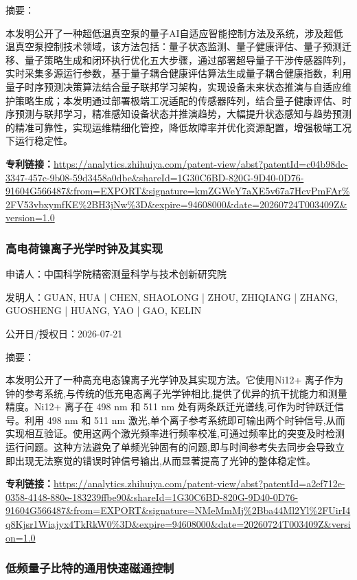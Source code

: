 \documentclass[12pt,a4paper]{ctexart}
\begin{document}
摘要：

本发明公开了一种超低温真空泵的量子AI自适应智能控制方法及系统，涉及超低温真空泵控制技术领域，该方法包括：量子状态监测、量子健康评估、量子预测迁移、量子策略生成和闭环执行优化五大步骤，通过部署超导量子干涉传感器阵列，实时采集多源运行参数，基于量子耦合健康评估算法生成量子耦合健康指数，利用量子时序预测决策算法结合量子联邦学习架构，实现设备未来状态推演与自适应维护策略生成；本发明通过部署极端工况适配的传感器阵列，结合量子健康评估、时序预测与联邦学习，精准感知设备状态并推演趋势，大幅提升状态感知与趋势预测的精准可靠性，实现运维精细化管控，降低故障率并优化资源配置，增强极端工况下运行稳定性。

\noindent\textbf{专利链接：}\url{https://analytics.zhihuiya.com/patent-view/abst?patentId=c04b98dc-3347-457c-9b08-59d3458a0dbe&shareId=1G30C6BD-820G-9D40-0D76-91604G566487&from=EXPORT&signature=kmZGWeY7aXE5v67a7HcvPmFAr%2FV53vbxymfKE%2BH3jNw%3D&expire=94608000&date=20260724T003409Z&version=1.0}

\subsubsection{ 高电荷镍离子光学时钟及其实现 }

申请人：中国科学院精密测量科学与技术创新研究院

发明人：GUAN, HUA | CHEN, SHAOLONG | ZHOU, ZHIQIANG | ZHANG, GUOSHENG | HUANG, YAO | GAO, KELIN

公开日/授权日：2026-07-21

摘要：

本发明公开了一种高充电态镍离子光学钟及其实现方法。它使用Ni12+ 离子作为钟的参考系统,与传统的低充电态离子光学钟相比,提供了优异的抗干扰能力和测量精度。Ni12+ 离子在 498 nm 和 511 nm 处有两条跃迁光谱线,可作为时钟跃迁信号。利用 498 nm 和 511 nm 激光,单个离子参考系统即可输出两个时钟信号,从而实现相互验证。使用这两个激光频率进行频率校准,可通过频率比的突变及时检测运行问题。这种方法避免了单频光钟固有的问题,即与时间参考失去同步会导致立即出现无法察觉的错误时钟信号输出,从而显著提高了光钟的整体稳定性。

\noindent\textbf{专利链接：}\url{https://analytics.zhihuiya.com/patent-view/abst?patentId=a2ef712e-0358-4148-880e-183239ffbe90&shareId=1G30C6BD-820G-9D40-0D76-91604G566487&from=EXPORT&signature=NMeMmMj%2Bba44Ml2Yl%2FUirI4q8Kjsr1Wiajyx4TkRkW0%3D&expire=94608000&date=20260724T003409Z&version=1.0}

\subsubsection{ 低频量子比特的通用快速磁通控制 }
\end{document}
